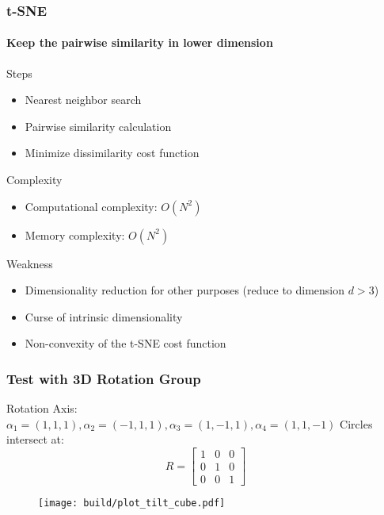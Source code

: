\documentclass{beamer}
\begin{document}
% 
% 
% 
% 
% 
%
\begin{frame}
  \frametitle{t-SNE}
  \framesubtitle{Keep the pairwise similarity in lower dimension}

  
  {Steps}
  \begin{itemize}
    \item Nearest neighbor search
    \item Pairwise similarity calculation
    \item Minimize dissimilarity cost function
  \end{itemize}

  {Complexity}
    \begin{itemize}
      \item Computational complexity: $O(N^2)$
      \item Memory complexity: $O(N^2)$
    \end{itemize}

    {Weakness}
    \begin{itemize}
      \item Dimensionality reduction for other purposes (reduce to dimension $d > 3$)
      \item Curse of intrinsic dimensionality 
      \item Non-convexity of the t-SNE cost function
    \end{itemize}    
    
\end{frame}

% 
% 
% 
% 
% 
%
\begin{frame}
  \frametitle{Test with 3D Rotation Group}
  
  Rotation Axis:
  $\alpha_1 = (1,1,1), \alpha_2 = (-1,1,1), \alpha_3 = (1,-1,1), \alpha_4 = (1,1,-1)$
  Circles intersect at:
  \[
    R = 
    \left[\begin{matrix}
         1 & 0 & 0 \\ 0 & 1 & 0 \\ 0 & 0 & 1 
    \end{matrix}  \right]
  \]
  \begin{figure}
    \centering
    \texttt{[image: build/plot\_tilt\_cube.pdf]}
  \end{figure}
    
\end{frame}
\end{document}
